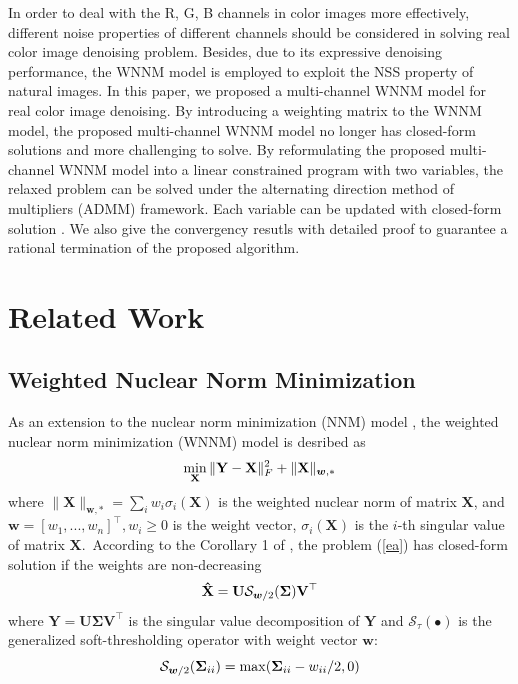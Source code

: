 \documentclass[10pt,twocolumn,letterpaper,sort&compress]{article}
\begin{document}
In order to deal with the R, G, B channels in color images more effectively, different noise properties of different channels should be considered in solving real color image denoising problem. Besides, due to its expressive denoising performance, the WNNM model \cite{wnnm} is employed to exploit the NSS property of natural images. In this paper, we proposed a multi-channel WNNM model for real color image denoising. By introducing a weighting matrix to the WNNM model, the proposed multi-channel WNNM model no longer has closed-form solutions and more challenging to solve. By reformulating the proposed multi-channel WNNM model into a linear constrained program with two variables, the relaxed problem can be solved under the alternating direction method of multipliers (ADMM) \cite{admm} framework. Each variable can be updated with closed-form solution \cite{wnnm,lugsvt}. We also give the convergency resutls with detailed proof to guarantee a rational termination of the proposed algorithm. 

\section{Related Work}

\subsection{Weighted Nuclear Norm Minimization}
As an extension to the nuclear norm minimization (NNM) model \cite{cai2010singular}, the weighted nuclear norm minimization (WNNM) model \cite{wnnm} is desribed as 
\vspace{-3mm}
\begin{equation}
\label{ea}
\vspace{-3mm}
\min_{\mathbf{X}}\|\mathbf{Y}-\mathbf{X}\|_{F}^{2}
+
\|\mathbf{X}\|_{\bm{w},*}
\end{equation}
where $\|\mathbf{X}\|_{\bm{w},*}=\sum_{i}w_{i}\sigma_{i}(\mathbf{X})$ is the weighted nuclear norm of matrix $\mathbf{X}$, and $\bm{w}=[w_{1},...,w_{n}]^{\top}, w_{i}\ge 0$ is the weight vector, $\sigma_{i}(\mathbf{X})$ is the $i$-th singular value of matrix $\mathbf{X}$.\ According to the Corollary 1 of \cite{wnnmijcv}, the problem (\ref{ea}) has closed-form solution if the weights are non-decreasing
\vspace{-3mm}  
\begin{equation}
\label{eb}
\vspace{-3mm}
\mathbf{\hat{X}}
=
\mathbf{U}
\mathcal{S}_{\bm{w}/2}
(\mathbf{\Sigma})
\mathbf{V}^{\top}
\end{equation}
where $\mathbf{Y}=\mathbf{U}\mathbf{\Sigma}\mathbf{V}^{\top}$ is the singular value decomposition \cite{eckart1936approximation} of $\mathbf{Y}$ and 
$\mathcal{S}_{\tau}(\bullet)$ is the generalized soft-thresholding operator with weight vector $\bm{w}$:
\vspace{-3mm}
\begin{equation}
\label{ec}
\vspace{-3mm}
\mathcal{S}_{\bm{w}/2}
(\mathbf{\Sigma}_{ii})
=
\max(\mathbf{\Sigma}_{ii}-w_{ii}/2, 0)
\end{equation}
\end{document}
